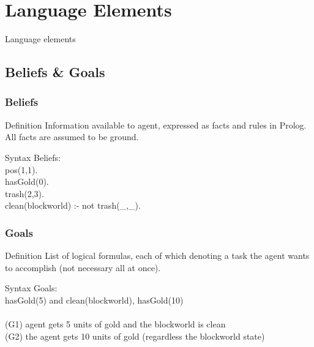 \section{Language Elements}
\begin{frame}
	\Huge{\centerline{Language elements}}
\end{frame}

\subsection{Beliefs \& Goals}
  \begin{frame}
    \frametitle{Beliefs}
    \begin{block}{Definition}
      Information available to agent, expressed as facts and rules in Prolog. All facts are assumed to be ground.
    \end{block}
    \begin{block}{Syntax}
      Beliefs: \\ 
      \tab  pos(1,1).\\
      \tab hasGold(0).\\
      \tab trash(2,3).\\
      \tab clean(blockworld) :- not trash(\_,\_).
    \end{block}
  \end{frame}
  
  \begin{frame}
    \frametitle{Goals}
    \begin{block}{Definition}
      List of logical formulas, each of which denoting a task the agent wants to accomplish (not necessary all at once).
    \end{block}
    \begin{block}{Syntax}
      Goals: \\
      \tab  hasGold(5) and clean(blockworld), hasGold(10) \\~\\
      (G1) agent gets 5 units of gold and the blockworld is clean \\ 
      (G2) the agent gets 10 units of gold (regardless the blockworld state)
    \end{block}
  \end{frame}
  
